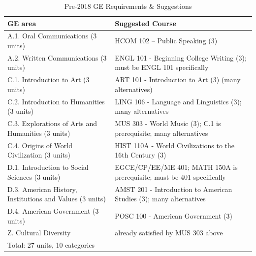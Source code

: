 \documentclass{book}
\begin{document}
\begin{table}
\caption{Pre-2018 GE Requirements \& Suggestions}
\begin{center}
\begin{tabular}{| p{3in} | p{3in} |} \hline
  \textbf{GE area} & \textbf{Suggested Course} \\ \hline
  A.1. Oral Communications (3 units) & HCOM 102 – Public Speaking (3) \\ \hline
  A.2. Written Communications (3 units) & ENGL 101 - Beginning College Writing (3); must be ENGL 101 specifically \\ \hline
  C.1. Introduction to Art (3 units) & ART 101 - Introduction to Art (3) (many alternatives) \\ \hline
  C.2. Introduction to Humanities (3 units) & LING 106 - Language and Linguistics (3); many alternatives \\ \hline
  C.3. Explorations of Arts and Humanities (3 units) & MUS 303 - World Music (3); C.1 is prerequisite; many alternatives \\ \hline
  C.4. Origins of World Civilization (3 units) & HIST 110A - World Civilizations to the 16th Century (3) \\ \hline
  D.1. Introduction to Social Sciences (3 units) & EGCE/CP/EE/ME 401; MATH 150A is prerequisite; must be 401 specifically \\ \hline
  D.3. American History, Institutions and Values (3 units) & AMST 201 - Introduction to American Studies (3); many alternatives \\ \hline
  D.4. American Government (3 units) & POSC 100 - American Government (3) \\ \hline
  Z. Cultural Diversity & already satisfied by MUS 303 above \\ \hline
  \multicolumn{2}{|l|}{Total: 27 units, 10 categories} \\ \hline
\end{tabular}
\end{center}
\end{table}
\end{document}
